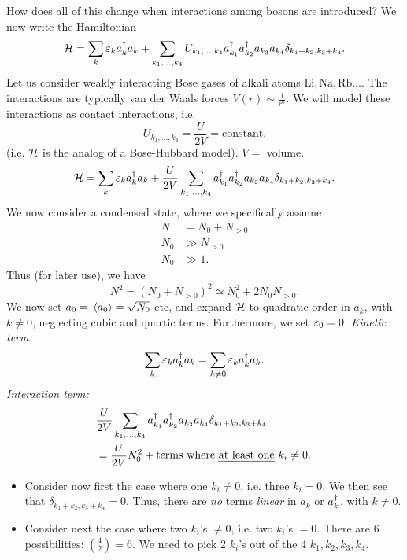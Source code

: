 How does all of this change when interactions among bosons are introduced?
We now write the Hamiltonian 
\begin{equation}
	\mathcal{H} = \sum_{k}\varepsilon_k a_{k}^{\dagger}a_{k} + \sum_{k_1, \dots, k_4}U_{k_1, \dots, k_4}a_{k_1}^{\dagger}a_{k_2}^{\dagger}a_{k_3}a_{k_4} \delta_{k_1 +k_2, k_3 + k_4}.
\end{equation}
Let us consider weakly interacting Bose gases of alkali atoms $\mathrm{Li, Na, Rb}\dots$.
The interactions are typically van der Waals forces $V(r) \sim \frac{1}{r^6}$. We will model these interactions as contact interactions, i.e. 
\begin{equation}
	U_{k_1, \dots, k_4} = \frac{U}{2V} = \mathrm{constant}.
\end{equation}
(i.e. $\mathcal{H}$ is the analog of a Bose-Hubbard model). $V = $ volume. 
\begin{equation}
	\mathcal{H} = \sum_{k}\varepsilon_k a_{k}^{\dagger}a_{k} + \frac{U}{2V}\sum_{k_1, \dots, k_4}a_{k_1}^{\dagger}a_{k_2}^{\dagger}a_{k_3}a_{k_4} \delta_{k_1 +k_2, k_3 + k_4}.
\end{equation}
We now consider a condensed state, where we specifically assume
\begin{align}
	N &= N_0 + N_{>0} \\
	N_0 &\gg N_{>0} \\
	N_{0} &\gg 1.
\end{align}
Thus (for later use), we have
\begin{equation}
	\label{eq:Nsquared}
	N^2= (N_0 + N_{>0})^2 \simeq N_0^2 + 2N_0N_{>0}.
\end{equation}
We now set $a_0 = \ev*{a_0} = \sqrt{N_0}$ etc, and expand $\mathcal{H}$ to quadratic order in $a_k$, with $k\ne0$, neglecting cubic and quartic terms. Furthermore, we set $\varepsilon_0 = 0$. 
\emph{Kinetic term:}
\begin{equation}
	\sum_{k}\varepsilon_k a_{k}^{\dagger}a_{k} = \sum_{k\ne0}\varepsilon_k a_{k}^{\dagger}a_{k}.
\end{equation}
\emph{Interaction term:}
\begin{equation}
	\begin{aligned}
	&\frac{U}{2V}\sum_{k_1, \dots, k_4}a_{k_1}^{\dg}a_{k_2}^{\dg}a_{k_3}a_{k_4} \delta_{k_1 +k_2, k_3 + k_4} \\
	&= \frac{U}{2V}N_0^2 + \parbox{5cm}{terms where \emph{at least one} $k_i\ne0$.}
	\end{aligned}
\end{equation}
\begin{itemize}
	\item Consider now first the case where one $k_i\ne0$, i.e. three $k_i = 0$. We then see that $ \delta_{k_1 +k_2, k_3 + k_4} = 0 $.
	Thus, there are \emph{no} terms \emph{linear} in $a_k$ or $a_{k}^{\dagger}$, with $k\ne0$. 
	\item Consider next the case where two $k_i$'s $\ne0$, i.e. two $k_i$'s $=0$. 
	There are 6 possibilities: $\binom{4}{2} = 6$. We need to pick 2 $k_i$'s out of the 4 $k_1, k_2, k_3, k_4$. 
\end{itemize}
